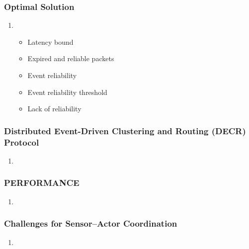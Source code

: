 \documentclass[11pt]{class}
\begin{document}
									\begin{frame}
										\frametitle{Optimal Solution}
										\begin{enumerate}
											\item 
											\begin{itemize}
												\item Latency bound
												\item Expired and reliable packets
												\item Event reliability
												\item Event reliability threshold
												\item Lack of reliability
											\end{itemize}
										\end{enumerate}
									\end{frame}
									
										\begin{frame}
											\frametitle{Distributed Event-Driven Clustering and Routing (DECR) Protocol}
											\begin{enumerate}
												\item  
											\end{enumerate}
										\end{frame}
										
										\begin{frame}
											\frametitle{PERFORMANCE}
											\begin{enumerate}
												\item 
											\end{enumerate}
										\end{frame}
											\begin{frame}
												\frametitle{Challenges for Sensor–Actor Coordination}
												\begin{enumerate}
													\item 
												\end{enumerate}
											\end{frame}
										
\end{document}
